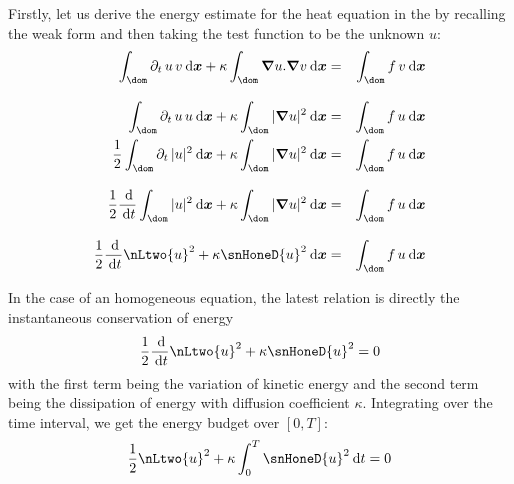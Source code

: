 Firstly, let us derive the energy estimate for the heat equation in the by recalling the weak form and then taking the test function to be the unknown $u$:
\begin{eqnarray*}
\int_\dom \pdt u\, v \dxd + \kappa \int_\dom \Grad u . \Grad v \dxd &=& \int_\dom f\,v \dxd \\[2ex]
\int_\dom \pdt u\, u \dxd + \kappa \int_\dom | \Grad u |^2 \dxd &=& \int_\dom f\,u \dxd \\
\dfrac{1}{2}\int_\dom \pdt |u|^2 \dxd + \kappa \int_\dom | \Grad u |^2 \dxd &=& \int_\dom f\,u \dxd \\[2ex]
\dfrac{1}{2} \ddd{t} \int_\dom  |u|^2 \dxd + \kappa \int_\dom | \Grad u |^2 \dxd &=& \int_\dom f\,u \dxd \\[2ex]
\dfrac{1}{2} \ddd{t} \nLtwo{u}^2 + \kappa \snHoneD{u}^2 \dxd &=& \int_\dom f\,u \dxd
\end{eqnarray*}

In the case of an homogeneous equation, the latest relation is directly the instantaneous conservation of energy
\begin{equation}
\dfrac{1}{2} \ddd{t} \nLtwo{u}^2 + \kappa \snHoneD{u}^2 = 0
\end{equation}
with the first term being the variation of kinetic energy and the second term being the dissipation of energy with diffusion coefficient $\kappa$.
Integrating over the time interval, we get the energy budget over $[0,T]$:
\begin{equation}\label{eq:energy_budget}
\dfrac{1}{2} \nLtwo{u}^2 + \kappa \int_{0}^T \snHoneD{u}^2 \dt = 0
\end{equation}

